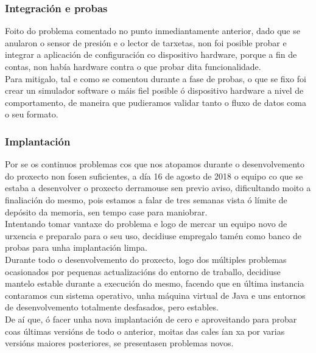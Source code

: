   \subsubsection{Integración e probas}
  
  Foito do problema comentado no punto inmediantamente anterior, dado que se
  anularon o sensor de presión e o lector de tarxetas, non foi posible probar
  e integrar a aplicación de configuración co dispositivo hardware, porque a fin
  de contas, non había hardware contra o que probar dita funcionalidade. \\
  
  Para mitigalo, tal e como se comentou durante a fase de probas, o que se fixo
  foi crear un simulador software o máis fiel posible ó dispositivo hardware a
  nivel de comportamento, de maneira que pudieramos validar tanto o fluxo de
  datos coma o seu formato.
  
  \subsubsection{Implantación}
  
  Por se os continuos problemas cos que nos atopamos durante o desenvolvemento
  do proxecto non fosen suficientes, a día 16 de agosto de 2018 o equipo co que
  se estaba a desenvolver o proxecto derramouse sen previo aviso, dificultando
  moito a finaliación do mesmo, pois estamos a falar de tres semanas vista ó
  límite de depósito da memoria, sen tempo case para maniobrar. \\
  
  Intentando tomar vantaxe do problema e logo de mercar un equipo novo de
  urxencia e preparalo para o seu uso, decidiuse empregalo tamén como banco de
  probas para unha implantación limpa. \\
  
  Durante todo o desenvolvemento do proxecto, logo dos múltiples problemas
  ocasionados por pequenas actualizacións do entorno de traballo, decidiuse
  mantelo estable durante a execución do mesmo, facendo que en última instancia
  contaramos cun sistema operativo, unha máquina virtual de Java e uns entornos
  de desenvolvemento totalmente desfasados, pero estables. \\
  
  De aí que, ó facer unha nova implantación de cero e aproveitando para probar
  coas últimas versións de todo o anterior, moitas das cales ían xa por varias
  versións maiores posteriores, se presentasen problemas novos. \\
  
